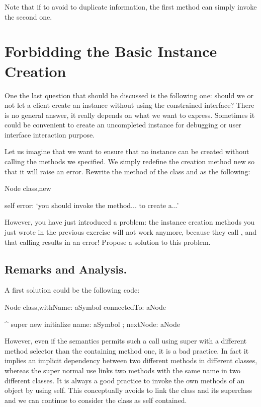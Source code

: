 Note that if to avoid to duplicate information, the first method can simply invoke the second one.



\section{Forbidding the Basic Instance Creation}
One the last question that should be discussed is the following one: should we or not let a client create an instance without using the constrained interface? There is no general answer, it really depends on what we want to express. Sometimes it could be convenient to create an uncompleted instance for debugging or user interface interaction purpose. 

Let us imagine that we want to ensure that no instance can be created without calling the methods we specified. We simply redefine the creation method new so that it will raise an error. Rewrite the  method of the class  and  as the following:

\begin{scode}
Node class\sep{}new

    self error: `you should invoke the method... to create a...' 
\end{scode}

However, you have just introduced a problem: the instance creation methods you just wrote in the previous exercise will not work anymore, because they call , and that calling results in an  error! Propose a solution to this problem.



\subsection{ Remarks and Analysis.}
A first solution could be the following code: 

\begin{scode}
Node class\sep{}withName: aSymbol connectedTo: aNode

      ^ super new initialize name: aSymbol ; nextNode: aNode
\end{scode}

However, even if the semantics permits such a call using super with a different method selector than the containing method one, it is a bad practice. In fact it implies an implicit dependency between two different methods in different classes, whereas the super normal use links two methods with the same name in two different classes. It is always a good practice to invoke the own methods of an object by using self. This conceptually avoids to link the class and its superclass and we can continue to consider 
the class as self contained.


